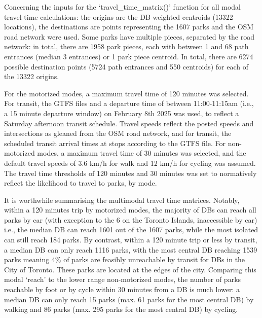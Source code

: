 \documentclass[
11pt, %
oneside, %
english, %
singlespacing, %
]{macthesis} %
\begin{document}
Concerning the inputs for the `travel\_time\_matrix()' function for all modal travel time calculations: the origins are the DB weighted centroids (13322 locations), the destinations are points representing the 1607 parks and the OSM road network were used. Some parks have multiple pieces, separated by the road network: in total, there are 1958 park pieces, each with between 1 and 68 path entrances (median 3 entrances) or 1 park piece centroid. In total, there are 6274 possible destination points (5724 path entrances and 550 centroids) for each of the 13322 origins.

For the motorized modes, a maximum travel time of 120 minutes was selected. For transit, the GTFS files and a departure time of between 11:00-11:15am (i.e., a 15 minute departure window) on February 8th 2025 was used, to reflect a Saturday afternoon transit schedule. Travel speeds reflect the posted speeds and intersections as gleaned from the OSM road network, and for transit, the scheduled transit arrival times at stops according to the GTFS file. For non-motorized modes, a maximum travel time of 30 minutes was selected, and the default travel speeds of 3.6 km/h for walk and 12 km/h for cycling was assumed. The travel time thresholds of 120 minutes and 30 minutes was set to normatively reflect the likelihood to travel to parks, by mode.

It is worthwhile summarising the multimodal travel time matrices. Notably, within a 120 minutes trip by motorized modes, the majority of DBs can reach all parks by car (with exception to the 6 on the Toronto Islands, inaccessible by car) i.e., the median DB can reach 1601 out of the 1607 parks, while the most isolated can still reach 184 parks. By contrast, within a 120 minute trip or less by transit, a median DB can only reach 1116 parks, with the most central DB reaching 1539 parks meaning 4\% of parks are feasibly unreachable by transit for DBs in the City of Toronto. These parks are located at the edges of the city. Comparing this modal `reach' to the lower range non-motorized modes, the number of parks reachable by foot or by cycle within 30 minutes from a DB is much lower: a median DB can only reach 15 parks (max. 61 parks for the most central DB) by walking and 86 parks (max. 295 parks for the most central DB) by cycling.
\end{document}
